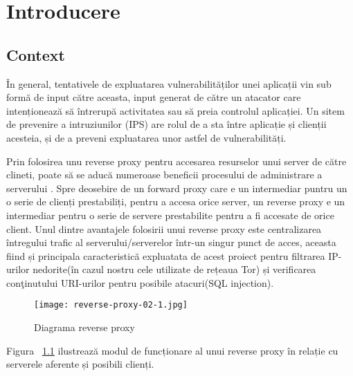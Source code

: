 
\chapter{Introducere}
\label{cap:Introducere}


\section{Context}

În general, tentativele de expluatarea vulnerabilităților unei aplicații vin sub formă de input către aceasta, input generat de către un atacator care intenționează să întrerupă activitatea sau să preia controlul aplicației. Un sitem de prevenire a intruziunilor (IPS) are rolul de a sta între aplicație și clienții acesteia, și de a preveni expluatarea unor astfel de vulnerabilități. 

Prin folosirea unu reverse proxy pentru accesarea resurselor unui server de către clineti, poate să se aducă numeroase beneficii procesului de administrare a serverului \cite{top_8}. Spre deosebire de un forward proxy care e un intermediar puntru un o serie de clienți prestabiliți, pentru a accesa orice server, un reverse proxy e un intermediar pentru o serie de servere prestabilite pentru a fi accesate de orice client. Unul dintre avantajele folosirii unui reverse proxy este centralizarea întregului trafic al serverului/serverelor într-un singur punct de acces, aceasta fiind și principala caracteristică expluatata de acest proiect pentru filtrarea IP-urilor nedorite(în cazul nostru cele utilizate de rețeaua Tor) și verificarea conţinutului URI-urilor pentru posibile atacuri(SQL injection).

\begin{figure}[h]
	\centering
	\texttt{[image: reverse-proxy-02-1.jpg]}
	\caption{Diagrama reverse proxy}
	\label{fig:reverse-proxy}
\end{figure}

Figura ~\ref{fig:reverse-proxy}  ilustrează modul de funcționare al unui reverse proxy în relație cu serverele aferente și posibili clienți.  \\


 


